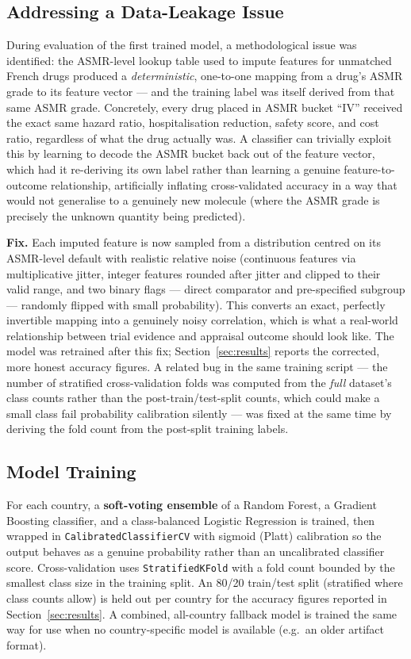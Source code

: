 \documentclass[11pt,a4paper]{article}
\begin{document}
\subsection{Addressing a Data-Leakage Issue}
\label{sec:leakage}
During evaluation of the first trained model, a methodological issue was identified: the ASMR-level
lookup table used to impute features for unmatched French drugs produced a \emph{deterministic},
one-to-one mapping from a drug's ASMR grade to its feature vector --- and the training label was
itself derived from that same ASMR grade. Concretely, every drug placed in ASMR bucket ``IV''
received the exact same hazard ratio, hospitalisation reduction, safety score, and cost ratio,
regardless of what the drug actually was. A classifier can trivially exploit this by learning to
decode the ASMR bucket back out of the feature vector, which had it re-deriving its own label
rather than learning a genuine feature-to-outcome relationship, artificially inflating
cross-validated accuracy in a way that would not generalise to a genuinely new molecule (where the
ASMR grade is precisely the unknown quantity being predicted).

\textbf{Fix.} Each imputed feature is now sampled from a distribution centred on its ASMR-level
default with realistic relative noise (continuous features via multiplicative jitter, integer
features rounded after jitter and clipped to their valid range, and two binary flags --- direct
comparator and pre-specified subgroup --- randomly flipped with small probability). This converts
an exact, perfectly invertible mapping into a genuinely noisy correlation, which is what a
real-world relationship between trial evidence and appraisal outcome should look like. The model
was retrained after this fix; Section~\ref{sec:results} reports the corrected, more honest
accuracy figures. A related bug in the same training script --- the number of stratified
cross-validation folds was computed from the \emph{full} dataset's class counts rather than the
post-train/test-split counts, which could make a small class fail probability calibration silently
--- was fixed at the same time by deriving the fold count from the post-split training labels.

\subsection{Model Training}
For each country, a \textbf{soft-voting ensemble} of a Random Forest, a Gradient Boosting
classifier, and a class-balanced Logistic Regression is trained, then wrapped in
\texttt{CalibratedClassifierCV} with sigmoid (Platt) calibration so the output behaves as a
genuine probability rather than an uncalibrated classifier score. Cross-validation uses
\texttt{StratifiedKFold} with a fold count bounded by the smallest class size in the training
split. An 80/20 train/test split (stratified where class counts allow) is held out per country for
the accuracy figures reported in Section~\ref{sec:results}. A combined, all-country fallback model
is trained the same way for use when no country-specific model is available (e.g.\ an older
artifact format).
\end{document}
